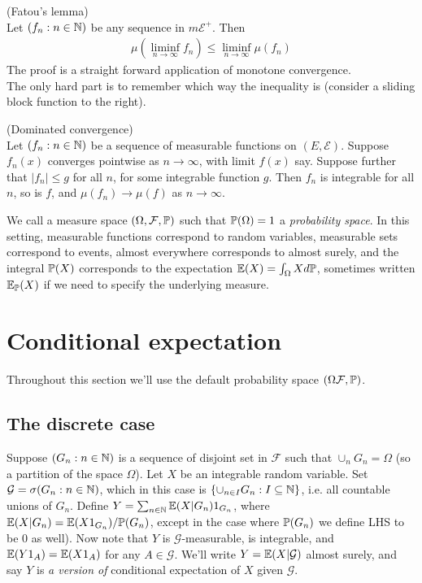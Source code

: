 \documentclass[a4paper]{article}
\begin{document}
\begin{lemma} (Fatou's lemma)\\
Let $(f_n:n \in \N)$ be any sequence in $m\mathcal{E}^+$. Then 
\begin{equation*}
\begin{aligned}
\mu(\liminf_{n\to \infty} f_n) \leq \liminf_{n \to \infty} \mu(f_n)
\end{aligned}
\end{equation*}
The proof is a straight forward application of monotone convergence.\\
The only hard part is to remember which way the inequality is (consider a sliding block function to the right).
\end{lemma}

\begin{thm} (Dominated convergence)\\
Let $(f_n:n \in \N)$ be a sequence of measurable functions on $(E,\mathcal{E})$. Suppose $f_n(x)$ converges pointwise as $n \to \infty$, with limit $f(x)$ say. Suppose further that $|f_n| \leq g$ for all $n$, for some integrable function $g$. Then $f_n$ is integrable for all $n$, so is $f$, and $\mu(f_n) \to \mu(f)$ as $n \to \infty$.
\end{thm}

\begin{defi}
We call a measure space $(\Omega,\mathcal{F},\P)$ such that $\P(\Omega)=1$ a \emph{probability space}. In this setting, measurable functions correspond to random variables, measurable sets correspond to events, almost everywhere corresponds to almost surely, and the integral $\P(X)$ corresponds to the expectation $\E(X) = \int_\Omega X d\P$, sometimes written $\E_\P(X)$ if we need to specify the underlying measure.
\end{defi}

\newpage

\section{Conditional expectation}
Throughout this section we'll use the default probability space $(\Omega \mathcal{F},\P)$.
\subsection{The discrete case}

Suppose $(G_n:n \in \N)$ is a sequence of disjoint set in $\mathcal{F}$ such that $\cup_n G_n = \Omega$ (so a partition of the space $\Omega$). Let $X$ be an integrable random variable. Set $\mathcal{G} = \sigma(G_n:n \in \N)$, which in this case is $\{\cup_{n \in I} G_n:I \subseteq \N\}$, i.e. all countable unions of $G_n$. Define $Y = \sum_{n \in \N} \E(X|G_n) 1_{G_n}$, where $\E(X|G_n) = \E(X 1_{G_n}) / \P(G_n)$, except in the case where $\P(G_n)$ we define LHS to be 0 as well). Now note that $Y$ is $\mathcal{G}$-measurable, is integrable, and $\E(Y 1_A) = \E(X 1_A)$ for any $A \in \mathcal{G}$. We'll write $Y =\E(X|\mathcal{G})$ almost surely, and say $Y$ is \emph{a version of} conditional expectation of $X$ given $\mathcal{G}$.
\end{document}
